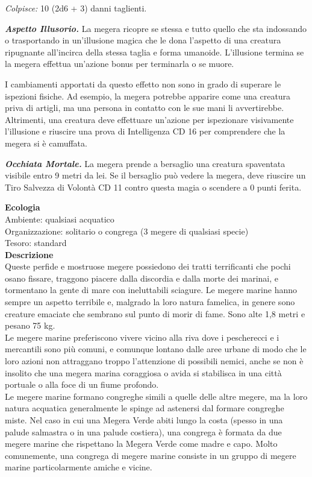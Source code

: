\begin{multicols}{2}
\emph{Colpisce:} 10 (2d6 + 3) danni taglienti.

\emph{\textbf{Aspetto Illusorio.}} La megera ricopre se stessa e tutto
quello che sta indossando o trasportando in un'illusione magica che le
dona l'aspetto di una creatura ripugnante all'incirca della stessa
taglia e forma umanoide. L'illusione termina se la megera effettua
un'azione bonus per terminarla o se muore.

I cambiamenti apportati da questo effetto non sono in grado di superare le ispezioni fisiche. Ad esempio, la megera potrebbe apparire come una creatura priva di artigli, ma una persona in contatto con le sue mani li avvertirebbe. Altrimenti, una creatura deve effettuare un'azione per ispezionare visivamente l'illusione e riuscire una prova di Intelligenza CD 16 per comprendere che la megera si è camuffata.

\emph{\textbf{Occhiata Mortale.}} La megera prende a bersaglio una creatura spaventata visibile entro 9 metri da lei. Se il bersaglio può vedere la megera, deve riuscire un Tiro Salvezza di Volontà CD 11 contro questa magia o scendere a 0 punti ferita.

\textbf{Ecologia}\\
Ambiente: qualsiasi acquatico\\
Organizzazione: solitario o congrega (3 megere di qualsiasi specie)\\
Tesoro: standard\\
\textbf{Descrizione}\\
Queste perfide e mostruose megere possiedono dei tratti terrificanti che pochi osano fissare, traggono piacere dalla discordia e dalla morte dei marinai, e tormentano la gente di mare con ineluttabili sciagure. Le megere marine hanno sempre un aspetto terribile e, malgrado la loro natura famelica, in genere sono creature emaciate che sembrano sul punto di morir di fame. Sono alte 1,8 metri e pesano 75 kg.\\

Le megere marine preferiscono vivere vicino alla riva dove i pescherecci e i mercantili sono più comuni, e comunque lontano dalle aree urbane di modo che le loro azioni non attraggano troppo l'attenzione di possibili nemici, anche se non è insolito che una megera marina coraggiosa o avida si stabilisca in una città portuale o alla foce di un fiume profondo.\\

Le megere marine formano congreghe simili a quelle delle altre megere, ma la loro natura acquatica generalmente le spinge ad astenersi dal formare congreghe miste. Nel caso in cui una Megera Verde abiti lungo la costa (spesso in una palude salmastra o in una palude costiera), una congrega è formata da due megere marine che rispettano la Megera Verde come madre e capo. Molto comunemente, una congrega di megere marine consiste in un gruppo di megere marine particolarmente amiche e vicine.\\



\end{multicols}
